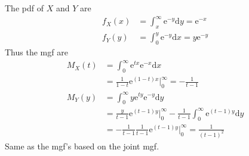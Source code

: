 \documentclass{article}
\begin{document}
\begin{enumerate}[leftmargin = 0 em, label = \arabic*., font = \bfseries]
\begin{enumerate}
		The pdf of $X$ and $Y$ are 
		\begin{align*}
		f_X (x) & = \int_{x}^\infty \mathrm{e}^{-y} \mathrm{d}y = \mathrm{e}^{-x}\\
		f_Y (y) & = \int_{0}^y \mathrm{e}^{-y}\mathrm{d}x = y \mathrm{e}^{-y}
		\end{align*}
		Thus the mgf are 
		\begin{align*}
		M_X (t) &= \int_{0}^\infty \mathrm{e}^{tx} \mathrm{e}^{-x}\mathrm{d}x\\
		& = \frac{1}{1 - t} \mathrm{e}^{(1 - t)x}\bigg|_{0}^{\infty} = - \frac{1}{t - 1}\\
		M_Y (y) & = \int_{0}^\infty y \mathrm{e}^{ty} \mathrm{e}^{-y}\mathrm{d}y\\
		& = \frac{y}{t - 1}\mathrm{e}^{(t - 1)y}\bigg|_0^\infty - \frac{1}{t - 1} \int_{0}^{\infty} \mathrm{e}^{(t - 1)y}\mathrm{d}y\\
		& = -\frac{1}{t - 1} \frac{1}{t - 1} \mathrm{e}^{(t - 1)y}\bigg|_{0}^\infty = \frac{1}{(t - 1)^2}
		\end{align*}
Same as the mgf's based on the joint mgf.
		
		
		
		
		
	\end{enumerate}
	
	


 	\end{enumerate}


	
	
	
	
\end{document}
